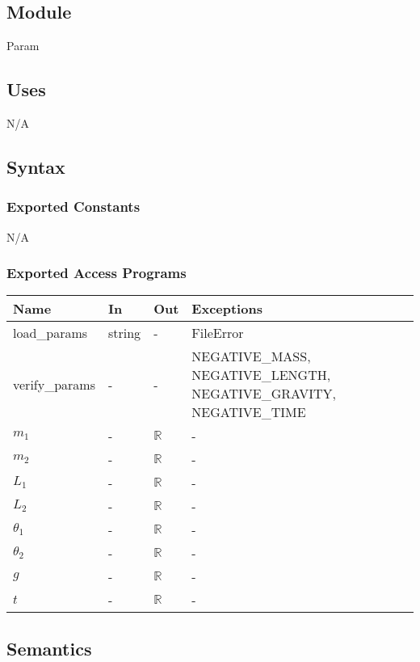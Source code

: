 \documentclass[12pt, titlepage]{article}
\begin{document}
\subsection{Module}

Param

\subsection{Uses}
N/A
\subsection{Syntax}

\subsubsection{Exported Constants}

N/A

\subsubsection{Exported Access Programs}

\begin{center}
\begin{tabular}{p{4cm} p{2cm} p{2cm} p{6cm}}
\hline
\textbf{Name} & \textbf{In} & \textbf{Out} & \textbf{Exceptions} \\
\hline
load\_params & string & - & FileError \\
\hline
verify\_params & - & - & NEGATIVE\_MASS, NEGATIVE\_LENGTH, NEGATIVE\_GRAVITY, NEGATIVE\_TIME\\
\hline
$m_1$ & - & $\mathbb{R}$ & - \\
\hline
$m_2$ & - & $\mathbb{R}$ & -\\
\hline
$L_1$ & - & $\mathbb{R}$ & - \\
\hline
$L_2$ & - & $\mathbb{R}$ & -\\
\hline
$\theta_1$ & - & $\mathbb{R}$ & -\\
\hline
$\theta_2$ & - & $\mathbb{R}$ & - \\
\hline
$g$ & - & $\mathbb{R}$ & - \\
\hline
$t$ & - & $\mathbb{R}$ & - \\
\hline
\end{tabular}
\end{center}

\subsection{Semantics}
\end{document}
